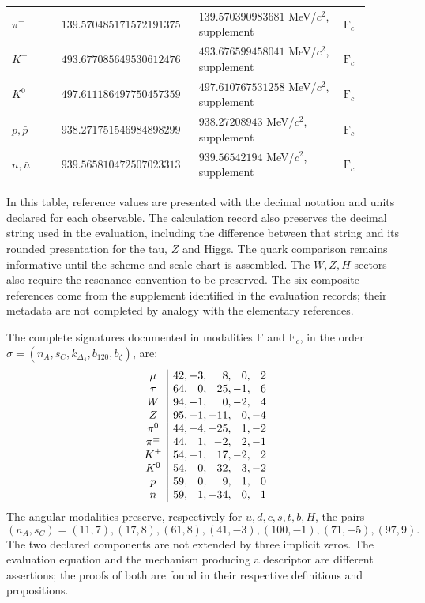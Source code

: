\begin{longtable}{p{0.13\linewidth}p{0.32\linewidth}p{0.38\linewidth}p{0.07\linewidth}}
\(\pi^\pm\) & \(139.570485171\allowbreak572191375\) & \(139.570390983681\) MeV/\(c^2\), supplement & \(\mathrm F_c\)\\
\(K^\pm\) & \(493.677085649\allowbreak530612476\) & \(493.676599458041\) MeV/\(c^2\), supplement & \(\mathrm F_c\)\\
\(K^0\) & \(497.611186497\allowbreak750457359\) & \(497.610767531258\) MeV/\(c^2\), supplement & \(\mathrm F_c\)\\
\(p,\bar p\) & \(938.271751546\allowbreak984898299\) & \(938.27208943\) MeV/\(c^2\), supplement & \(\mathrm F_c\)\\
\(n,\bar n\) & \(939.565810472\allowbreak507023313\) & \(939.56542194\) MeV/\(c^2\), supplement & \(\mathrm F_c\)\\
\end{longtable}
\endgroup

In this table, reference values are presented with the decimal
notation and units declared for each observable. The calculation
record also preserves the decimal string used in the evaluation,
including the difference between that string and its rounded presentation for
the tau, \(Z\) and Higgs. The quark comparison
remains informative until the scheme and scale chart is assembled.
The \(W,Z,H\) sectors also require the resonance convention
to be preserved. The six composite references come from the supplement
identified in the evaluation records; their metadata are not completed
by analogy with the elementary references.

The complete signatures documented in modalities \(\mathrm F\) and
\(\mathrm F_c\), in the order
\(\sigma=(n_A,s_C,k_{\Delta_4},b_{120},b_\zeta)\), are:
\[
\begin{array}{c|r@{,\,}r@{,\,}r@{,\,}r@{,\,}r}
\mu&42&-3&8&0&2\\
\tau&64&0&25&-1&6\\
W&94&-1&0&-2&4\\
Z&95&-1&-11&0&-4\\
\pi^0&44&-4&-25&1&-2\\
\pi^\pm&44&1&-2&2&-1\\
K^\pm&54&-1&17&-2&2\\
K^0&54&0&32&3&-2\\
p&59&0&9&1&0\\
n&59&1&-34&0&1
\end{array}
\]
The angular modalities preserve, respectively for
\(u,d,c,s,t,b,H\), the pairs
\[
(n_A,s_C)=(11,7),(17,8),(61,8),(41,-3),(100,-1),(71,-5),(97,9).
\]
The two declared components are not extended by
three implicit zeros. The evaluation equation and the mechanism
producing a descriptor are different assertions; the proofs of both
are found in their respective definitions and propositions.

